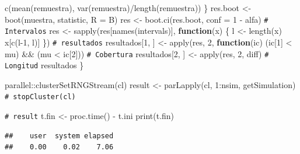 \documentclass[
]{book}
\newenvironment{Shaded}{\begin{snugshade}}{\end{snugshade}}
\newcommand{\AttributeTok}[1]{\textcolor[rgb]{0.77,0.63,0.00}{#1}}
\newcommand{\CommentTok}[1]{\textcolor[rgb]{0.56,0.35,0.01}{\textit{#1}}}
\newcommand{\ControlFlowTok}[1]{\textcolor[rgb]{0.13,0.29,0.53}{\textbf{#1}}}
\newcommand{\DecValTok}[1]{\textcolor[rgb]{0.00,0.00,0.81}{#1}}
\newcommand{\FunctionTok}[1]{\textcolor[rgb]{0.00,0.00,0.00}{#1}}
\newcommand{\NormalTok}[1]{#1}
\newcommand{\OtherTok}[1]{\textcolor[rgb]{0.56,0.35,0.01}{#1}}
\newcommand{\SpecialCharTok}[1]{\textcolor[rgb]{0.00,0.00,0.00}{#1}}
\theoremstyle{break}
\theoremstyle{nonumberplain}
\renewcommand{\CommentTok}[1]{\textcolor[rgb]{0.41,0.41,0.41}{\texttt{#1}}}
\begin{document}
\begin{Shaded}
\begin{Highlighting}[]
      \FunctionTok{c}\NormalTok{(}\FunctionTok{mean}\NormalTok{(remuestra), }\FunctionTok{var}\NormalTok{(remuestra)}\SpecialCharTok{/}\FunctionTok{length}\NormalTok{(remuestra))}
\NormalTok{    \}}
\NormalTok{    res.boot }\OtherTok{\textless{}{-}} \FunctionTok{boot}\NormalTok{(muestra, statistic, }\AttributeTok{R =}\NormalTok{ B)}
\NormalTok{    res }\OtherTok{\textless{}{-}} \FunctionTok{boot.ci}\NormalTok{(res.boot, }\AttributeTok{conf =} \DecValTok{1} \SpecialCharTok{{-}}\NormalTok{ alfa)}
    \CommentTok{\# Intervalos}
\NormalTok{    res }\OtherTok{\textless{}{-}} \FunctionTok{sapply}\NormalTok{(res[}\FunctionTok{names}\NormalTok{(intervals)], }\ControlFlowTok{function}\NormalTok{(x) \{}
\NormalTok{      l }\OtherTok{\textless{}{-}} \FunctionTok{length}\NormalTok{(x)}
\NormalTok{      x[}\FunctionTok{c}\NormalTok{(l}\DecValTok{{-}1}\NormalTok{, l)]}
\NormalTok{    \})}
    \CommentTok{\# resultados}
\NormalTok{    resultados[}\DecValTok{1}\NormalTok{, ] }\OtherTok{\textless{}{-}} \FunctionTok{apply}\NormalTok{(res, }\DecValTok{2}\NormalTok{,}
                                   \ControlFlowTok{function}\NormalTok{(ic) (ic[}\DecValTok{1}\NormalTok{] }\SpecialCharTok{\textless{}}\NormalTok{ mu) }\SpecialCharTok{\&\&}\NormalTok{ (mu }\SpecialCharTok{\textless{}}\NormalTok{ ic[}\DecValTok{2}\NormalTok{])) }\CommentTok{\# Cobertura}
\NormalTok{    resultados[}\DecValTok{2}\NormalTok{, ] }\OtherTok{\textless{}{-}} \FunctionTok{apply}\NormalTok{(res, }\DecValTok{2}\NormalTok{, diff) }\CommentTok{\# Longitud}
\NormalTok{    resultados}
\NormalTok{\}}

\NormalTok{parallel}\SpecialCharTok{::}\FunctionTok{clusterSetRNGStream}\NormalTok{(cl)}
\NormalTok{result }\OtherTok{\textless{}{-}} \FunctionTok{parLapply}\NormalTok{(cl, }\DecValTok{1}\SpecialCharTok{:}\NormalTok{nsim, getSimulation)}
\CommentTok{\# stopCluster(cl)}

\CommentTok{\# result}
\NormalTok{t.fin }\OtherTok{\textless{}{-}} \FunctionTok{proc.time}\NormalTok{() }\SpecialCharTok{{-}}\NormalTok{ t.ini}
\FunctionTok{print}\NormalTok{(t.fin)}
\end{Highlighting}
\end{Shaded}

\begin{verbatim}
##    user  system elapsed 
##    0.00    0.02    7.06
\end{verbatim}
\end{document}
